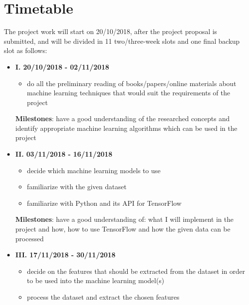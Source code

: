 \section*{Timetable}

The project work will start on 20/10/2018, after the project proposal is submitted, and will be divided in 11 two/three-week slots and one final backup slot as follows: \\

\begin{itemize}
  \item \textbf{I. 20/10/2018 - 02/11/2018}

        \begin{itemize}

          \item do all the preliminary reading of books/papers/online materials about machine learning techniques that
                would suit the requirements of the project

        \end{itemize}

        \textbf{Milestones}: have a good understanding of the researched concepts and identify appropriate machine learning algorithms which can be used in the project\\


  \item \textbf{II. 03/11/2018 - 16/11/2018}

        \begin{itemize}

          \item decide which machine learning models to use
          \item familiarize with the given dataset
          \item familiarize with Python and its API for TensorFlow

        \end{itemize}

        \textbf{Milestones}: have a good understanding of: what I will implement in the project and how, how to use TensorFlow and how the given data can be processed\\




  \item \textbf{III. 17/11/2018 - 30/11/2018}

        \begin{itemize}

          \item decide on the features that should be extracted from the dataset in order to be used into the machine learning model(s)
          \item process the dataset and extract the chosen features


\end{itemize}
\end{itemize}
